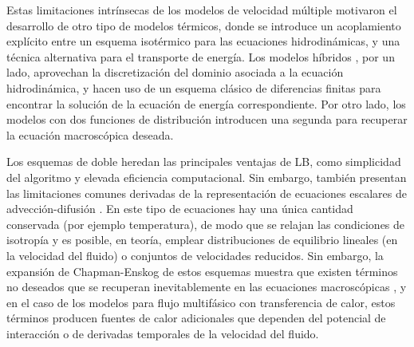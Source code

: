 Estas limitaciones intr\'insecas de los modelos de velocidad m\'ultiple motivaron el desarrollo de otro tipo de modelos t\'ermicos, donde se introduce un acoplamiento expl\'icito entre un esquema isot\'ermico para las ecuaciones hidrodin\'amicas, y una t\'ecnica alternativa para el transporte de energ\'ia. Los modelos h\'ibridos \cite{dong_numerical_2012,li_lattice_2015}, por un lado, aprovechan la discretizaci\'on del dominio asociada a la ecuaci\'on hidrodin\'amica, y hacen uso de un esquema cl\'asico de diferencias finitas para encontrar la soluci\'on de la ecuaci\'on de energ\'ia correspondiente. Por otro lado, los modelos con dos funciones de distribuci\'on introducen una segunda \lbe{} para recuperar la ecuaci\'on macrosc\'opica deseada.

Los esquemas de doble \fdp{} heredan las principales ventajas de LB, como simplicidad del algoritmo y elevada eficiencia computacional. Sin embargo, tambi\'en presentan las limitaciones comunes derivadas de la representaci\'on de ecuaciones escalares de advecci\'on-difusi\'on \cite{markus_simulation_2011, huang_modified_2014, li_improved_2017, huang_numerical_2011, li_effect_2014, huang_multiphase_2015}. En este tipo de ecuaciones hay una \'unica cantidad conservada (por ejemplo temperatura), de modo que se relajan las condiciones de isotrop\'ia y es posible, en teor\'ia, emplear distribuciones de equilibrio lineales (en la velocidad del fluido) o conjuntos de velocidades reducidos. Sin embargo, la expansi\'on de Chapman-Enskog de estos esquemas muestra que existen t\'erminos no deseados que se recuperan inevitablemente en las ecuaciones macrosc\'opicas \cite{kruger_lattice_2017, huang_modified_2014, huang_numerical_2011}, y en el caso de los modelos para flujo multif\'asico con transferencia de calor, estos t\'erminos producen fuentes de calor adicionales que dependen del potencial de interacci\'on o de derivadas temporales de la velocidad del fluido.

